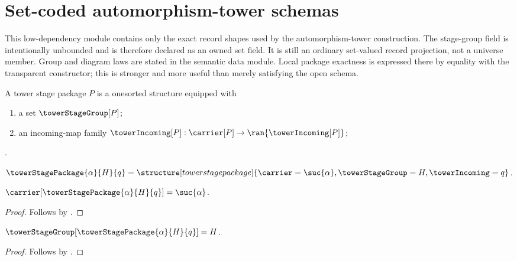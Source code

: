 

\section{Set-coded automorphism-tower schemas}

This low-dependency module contains only the exact record shapes used by the
automorphism-tower construction.  The stage-group field is intentionally
unbounded and is therefore declared as an owned set field.  It is still an
ordinary set-valued record projection, not a universe member.  Group and
diagram laws are stated in the semantic data module.  Local package exactness
is expressed there by equality with the transparent constructor; this is
stronger and more useful than merely satisfying the open schema.

\begin{struct}\label{tower_stage_package}
    A tower stage package $P$ is a onesorted structure equipped with
    \begin{enumerate}
        \item\label{tower_stage_package_group_field}
            a set $\towerStageGroup[P]$;
        \item\label{tower_stage_package_incoming_field}
            an incoming-map family
            $\towerIncoming[P]:
                \carrier[P]\to\ran{\towerIncoming[P]}$;
    \end{enumerate}.
\end{struct}

\begin{definition}\label{tower_stage_package_structure}
    $\towerStagePackage{\alpha}{H}{q}=
        \structure[tower stage package]{
            \carrier=\suc{\alpha},
            \towerStageGroup=H,
            \towerIncoming=q
        }$.
\end{definition}

\begin{proposition}\label{tower_stage_package_structure_carrier}
    $\carrier[\towerStagePackage{\alpha}{H}{q}]=\suc{\alpha}$.
\end{proposition}
\begin{proof}
    Follows by
        .
\end{proof}

\begin{proposition}\label{tower_stage_package_structure_group}
    $\towerStageGroup[\towerStagePackage{\alpha}{H}{q}]=H$.
\end{proposition}
\begin{proof}
    Follows by
        .
\end{proof}


